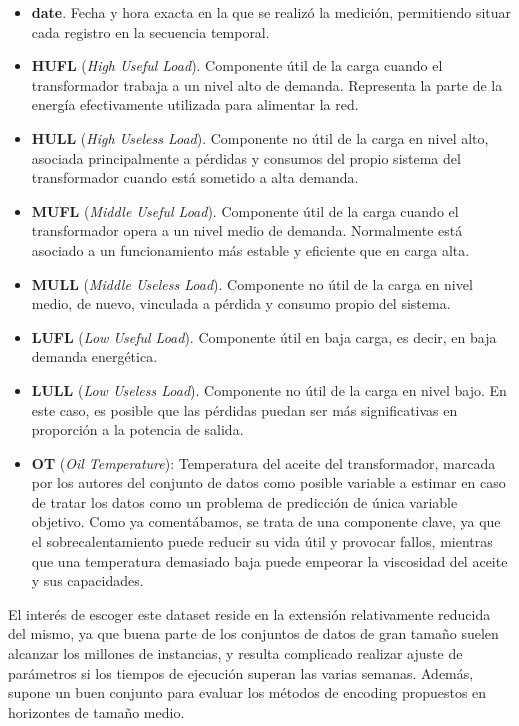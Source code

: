 \begin{itemize}
	\item \textbf{date}. Fecha y hora exacta en la que se realizó la medición, permitiendo situar cada registro en la secuencia temporal.
	
	\item \textbf{HUFL} (\textit{High Useful Load}). Componente útil de la carga cuando el transformador trabaja a un nivel alto de demanda. Representa la parte de la energía efectivamente utilizada para alimentar la red.
	
	\item \textbf{HULL} (\textit{High Useless Load}). Componente no útil de la carga en nivel alto, asociada principalmente a pérdidas y consumos del propio sistema del transformador cuando está sometido a alta demanda.
	
	\item \textbf{MUFL} (\textit{Middle Useful Load}). Componente útil de la carga cuando el transformador opera a un nivel medio de demanda. Normalmente está asociado a un funcionamiento más estable y eficiente que en carga alta.
	
	\item \textbf{MULL} (\textit{Middle Useless Load}). Componente no útil de la carga en nivel medio, de nuevo, vinculada a pérdida y consumo propio del sistema.
	
	\item \textbf{LUFL} (\textit{Low Useful Load}). Componente útil en baja carga, es decir, en baja demanda energética.
	
	\item \textbf{LULL} (\textit{Low Useless Load}). Componente no útil de la carga en nivel bajo. En este caso, es posible que las pérdidas puedan ser más significativas en proporción a la potencia de salida.
	
	\item \textbf{OT} (\textit{Oil Temperature}): Temperatura del aceite del transformador, marcada por los autores del conjunto de datos como posible variable a estimar en caso de tratar los datos como un problema de predicción de única variable objetivo. Como ya comentábamos, se trata de una componente clave, ya que el sobrecalentamiento puede reducir su vida útil y provocar fallos, mientras que una temperatura demasiado baja puede empeorar la viscosidad del aceite y sus capacidades.
\end{itemize}

El interés de escoger este dataset reside en la extensión relativamente reducida del mismo, ya que buena parte de los conjuntos de datos de gran tamaño suelen alcanzar los millones de instancias, y resulta complicado realizar ajuste de parámetros si los tiempos de ejecución superan las varias semanas. Además, supone un buen conjunto para evaluar los métodos de encoding propuestos en horizontes de tamaño medio.\\

